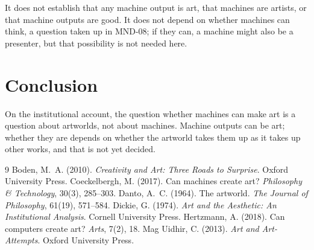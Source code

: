 \documentclass{situationist-preprint}
\begin{document}
It does not establish that any machine output is art, that machines are artists, or that machine outputs are good. It does not depend on whether machines can think, a question taken up in MND-08; if they can, a machine might also be a presenter, but that possibility is not needed here.

\section{Conclusion}

On the institutional account, the question whether machines can make art is a question about artworlds, not about machines. Machine outputs can be art; whether they are depends on whether the artworld takes them up as it takes up other works, and that is not yet decided.

\begin{thebibliography}{9}
 Boden, M.~A. (2010). \emph{Creativity and Art: Three Roads to Surprise}. Oxford University Press.
 Coeckelbergh, M. (2017). Can machines create art? \emph{Philosophy \& Technology}, 30(3), 285--303.
 Danto, A.~C. (1964). The artworld. \emph{The Journal of Philosophy}, 61(19), 571--584.
 Dickie, G. (1974). \emph{Art and the Aesthetic: An Institutional Analysis}. Cornell University Press.
 Hertzmann, A. (2018). Can computers create art? \emph{Arts}, 7(2), 18.
 Mag Uidhir, C. (2013). \emph{Art and Art-Attempts}. Oxford University Press.
\end{thebibliography}
\end{document}
